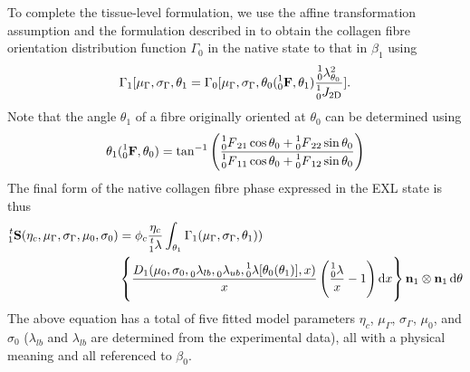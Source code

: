     To complete the tissue-level formulation, we use the affine transformation assumption and the formulation described in \cite{fan_simulation_2014} to obtain the collagen fibre orientation distribution function $\Gamma_0$ in the native state to that in $\beta_1$ using
        \begin{equation}\label{c3:eqn:45}
        \begin{aligned}
        \Gamma_1[\mu_\Gamma,\sigma_\Gamma, \theta_1 = \Gamma_0[\mu_\Gamma, \sigma_\Gamma, \theta_0(\prescript{1}{0}{\mathbf{F}},\theta_1)\frac{\prescript{1}{0}{\lambda}_{\theta_0}^2}{\prescript{1}{0}{J_\mathrm{2D}}}].
        \end{aligned}
        \end{equation}
    Note that the angle $\theta_1$ of a fibre originally oriented at $\theta_0$ can be determined using
        \begin{equation}\label{c3:eqn:46}
        \begin{aligned}
        \theta_1(\prescript{1}{0}{\mathbf{F}},\theta_0) = \tan^{-1}\left(\frac{\prescript{1}{0}{F}_{21}\cos{\theta_0} + \prescript{1}{0}{F}_{22}\sin{\theta_0}}{\prescript{1}{0}{F}_{11}\cos{\theta_0} + \prescript{1}{0}{F}_{12}\sin{\theta_0}}\right)
        \end{aligned}
        \end{equation}
    The final form of the native collagen fibre phase expressed in the EXL state is thus
        \begin{equation}\label{c3:eqn:47}
        \begin{aligned}
        \prescript{t}{1}{\mathbf{S}}(\eta_c, \mu_\Gamma, \sigma_\Gamma, \mu_0, \sigma_0)& = \phi_c\frac{\eta_c}{\prescript{t}{1}{\lambda}} \int_{\theta_1} \Gamma_1(\mu_\Gamma, \sigma_\Gamma,\theta_1))
        \\
        &\left\{ \frac{D_1(\mu_0, \sigma_0, \prescript{}{0}{\lambda}_{lb}, \prescript{}{0}{\lambda}_{ub},\prescript{1}{0}{\lambda}[\theta_0(\theta_1)],x)}{x}\left(\frac{\prescript{1}{0}{\lambda}}{x} - 1\right)\dif x\right\}\mathbf{n}_1\otimes\mathbf{n}_1 \dif \theta
        \end{aligned}
        \end{equation}
    The above equation has a total of five fitted model parameters $\eta_c$, $\mu_\Gamma$, $\sigma_\Gamma$, $\mu_0$, and $\sigma_0$ ($\lambda_{lb}$ and $\lambda_{lb}$ are determined from the experimental data), all with a physical meaning and all referenced to $\beta_0$.

